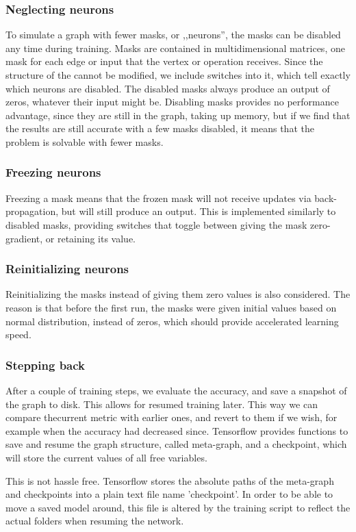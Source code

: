 \documentclass[12pt]{report}
\begin{document}
\subsubsection{Neglecting neurons}
To simulate a graph with fewer masks, or ,,neurons'', the masks can be disabled any time during training. Masks are contained in multidimensional matrices, one mask for each edge or input that the vertex or operation receives. Since the structure of the cannot be modified, we include switches into it, which tell exactly which neurons are disabled. The disabled masks always produce an output of zeros, whatever their input might be. Disabling masks provides no performance advantage, since they are still in the graph, taking up memory, but if we find that the results are still accurate with a few masks disabled, it means that the problem is solvable with fewer masks.
\subsubsection{Freezing neurons}
Freezing a mask means that the frozen mask will not receive updates via back-propagation, but will still produce an output. This is implemented similarly to disabled masks, providing switches that toggle between giving the mask zero-gradient, or retaining its value.
\subsubsection{Reinitializing neurons}
Reinitializing the masks instead of giving them zero values is also considered. The reason is that before the first run, the masks were given initial values based on normal distribution, instead of zeros, which should provide accelerated learning speed.
\subsubsection{Stepping back}
After a couple of training steps, we evaluate the accuracy, and save a snapshot of the graph to disk. This allows for resumed training later. This way we can compare thecurrent metric with earlier ones, and revert to them if we wish, for example when the accuracy had decreased since. Tensorflow provides functions to save and resume the graph structure, called meta-graph, and a checkpoint, which will store the current values of all free variables.

This is not hassle free. Tensorflow stores the absolute paths of the meta-graph and checkpoints into a plain text file name 'checkpoint'. In order to be able to move a saved model around, this file is altered by the training script to reflect the actual folders when resuming the network.
\end{document}
